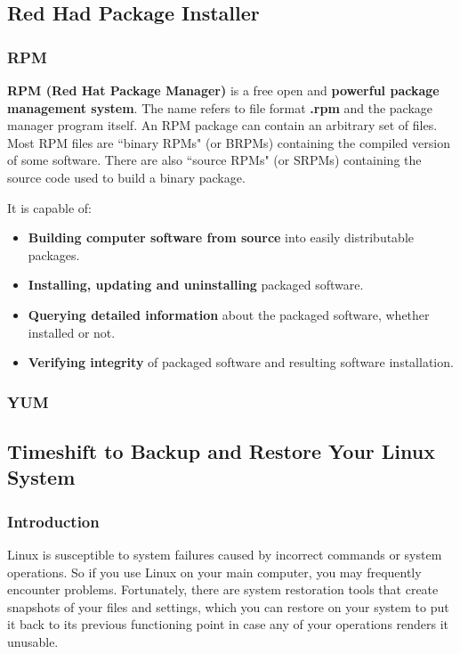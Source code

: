 \documentclass{article}
\begin{document}
\subsection{Red Had Package Installer}
\subsubsection{RPM}
\textbf{RPM (Red Hat Package Manager)} is a free open and \textbf{powerful package management system}. The name refers to file format \textbf{.rpm} and the package manager program itself. An RPM package can contain an arbitrary set of files. Most RPM files are “binary RPMs" (or BRPMs) containing the compiled version of some software. There are also “source RPMs" (or SRPMs) containing the source code used to build a binary package.

It is capable of:

\begin{itemize}
    \item \textbf{Building computer software from source} into easily distributable packages.
    \item \textbf{Installing, updating and uninstalling} packaged software.
    \item \textbf{Querying detailed information} about the packaged software, whether installed or not.
    \item \textbf{Verifying integrity} of packaged software and resulting software installation.
\end{itemize}

\subsubsection{YUM}

\subsection{Timeshift to Backup and Restore Your Linux System}

\subsubsection{Introduction}
Linux is susceptible to system failures caused by incorrect commands or system operations. So if you use Linux on your main computer, you may frequently encounter problems. Fortunately, there are system restoration tools that create snapshots of your files and settings, which you can restore on your system to put it back to its previous functioning point in case any of your operations renders it unusable.
\end{document}
